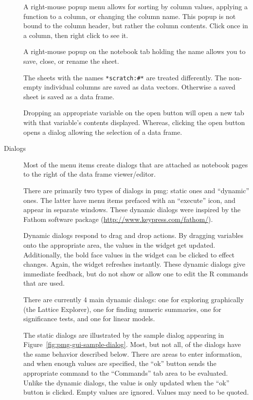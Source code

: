 \documentclass[12pt]{article}
\begin{document}
\begin{description}
  A right-mouse popup menu allows for sorting by column
  values, applying a function to a column, or changing the column
  name. This popup is not bound to the column header, but rather the
  column contents. Click once in a column, then right click to see it.

  A right-mouse popup on the notebook tab holding the name allows you
  to save, close, or rename the sheet.

  The sheets with the names \verb+*scratch:#*+ are treated
  differently. The non-empty individual columns are saved as data
  vectors. Otherwise a saved sheet is saved as a data frame.

  Dropping an appropriate variable on the open button will open a new
  tab with that variable's contents displayed. Whereas, clicking the
  open button opens a dialog allowing the selection of a data frame.

  
\item[Dialogs] 
  Most of the menu items create dialogs that are attached as notebook
  pages to the right of the data frame viewer/editor. 
  
  There are primarily two types of dialogs in pmg: static ones and
  ``dynamic'' ones. The latter have menu items prefaced with an
  ``execute'' icon, and appear in separate windows. These dynamic
  dialogs were inspired by the Fathom software package
  (\url{http://www.keypress.com/fathom/}).
  
  Dynamic dialogs respond to drag and drop actions. By dragging
  variables onto the appropriate area, the values in the widget get
  updated. Additionally, the bold face values in the widget can be
  clicked to effect changes. Again, the widget refreshes instantly.
  These dynamic dialogs give immediate feedback, but do not show or
  allow one to edit the R commands that are used.

  There are currently 4 main dynamic dialogs: one for exploring
  graphically (the Lattice Explorer), one for finding numeric
  summaries, one for significance tests, and one for linear models.
  

  The static dialogs are illustrated by the sample dialog appearing in
  Figure~\ref{fig:pmg-gui-sample-dialog}. Most, but not all, of the
  dialogs have the same behavior described below. There are areas to
  enter information, and when enough values are specified, the ``ok''
  button sends the appropriate command to the ``Commands'' tab area to
  be evaluated.  Unlike the dynamic dialogs, the value is only updated
  when the ``ok'' button is clicked.  Empty values are ignored. Values
  may need to be quoted.


\end{description}
\end{document}
